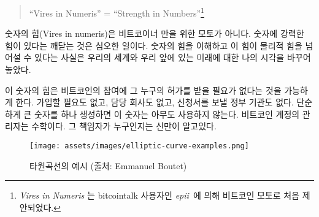 	\begin{quotation}\begin{samepage}
			\enquote{Vires in Numeris} = \enquote{Strength in Numbers}\footnote{\textit{Vires in Numeris} 는 bitcointalk 사용자인 \textit{epii}~\cite{epii}에 의해 
				비트코인 모토로 처음 제안되었다.}
	\end{samepage}\end{quotation}
	
	\begin{comment}
		\textit{Vires in numeris} is not only a catchy motto used by bitcoiners. The
		realization that there is an unfathomable strength to be found in
		numbers is a profound one. Understanding this, and the inversion of
		existing power balances which it enables changed my view of the world
		and the future which lies ahead of us.
	\end{comment}
	숫자의 힘(Vires in numeris)은 비트코이너 만을 위한 모토가 아니다.
	숫자에 강력한 힘이 있다는 깨닫는 것은 심오한 일이다.
	숫자의 힘을 이해하고 이 힘이 물리적 힘을 넘어설 수 있다는 사실은 
	우리의 세계와 우리 앞에 있는 미래에 대한 나의 시각을 바꾸어 놓았다.
	
	\begin{comment}
		One direct result of this is the fact that you don't have to ask anyone for permission to participate in Bitcoin. 
		There is no page to sign up, no company in charge, no government agency to send application forms to.
		Simply generate a large number and you are pretty much good to go. 
		The central authority of account creation is mathematics. And God only knows who is in charge of that.
	\end{comment}
	이 숫자의 힘은 비트코인의 참여에 그 누구의 허가를 받을 필요가 없다는 것을 가능하게 한다.
	가입할 필요도 없고, 담당 회사도 없고, 신청서를 보낼 정부 기관도 없다.
	단순하게 큰 숫자를 하나 생성하면 이 숫자는 아무도 사용하지 않는다.
	비트코인 계정의 관리자는 수학이다. 그 책임자가 누구인지는 신만이 알고있다.
	
	\begin{figure}
		\texttt{[image: assets/images/elliptic-curve-examples.png]}
		\caption{타원곡선의 예시 (출처: Emmanuel Boutet)}
		\label{fig:elliptic-curve-examples}
	\end{figure}
	
